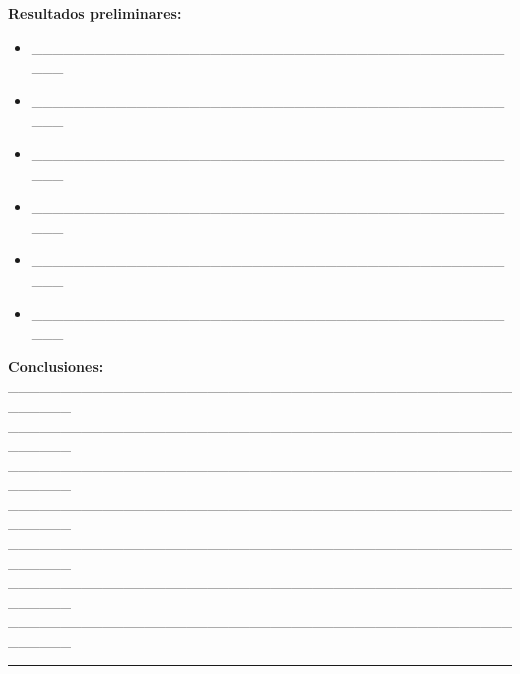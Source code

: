 \vspace{0.5em}
\textbf{Resultados preliminares:}
\begin{itemize}
  \item \_\_\_\_\_\_\_\_\_\_\_\_\_\_\_\_\_\_\_\_\_\_\_\_\_\_\_\_\_\_\_\_\_\_\_\_\_\_\_\_\_\_\_\_\_\_\_\_
  \item \_\_\_\_\_\_\_\_\_\_\_\_\_\_\_\_\_\_\_\_\_\_\_\_\_\_\_\_\_\_\_\_\_\_\_\_\_\_\_\_\_\_\_\_\_\_\_\_
  \item \_\_\_\_\_\_\_\_\_\_\_\_\_\_\_\_\_\_\_\_\_\_\_\_\_\_\_\_\_\_\_\_\_\_\_\_\_\_\_\_\_\_\_\_\_\_\_\_
  \item \_\_\_\_\_\_\_\_\_\_\_\_\_\_\_\_\_\_\_\_\_\_\_\_\_\_\_\_\_\_\_\_\_\_\_\_\_\_\_\_\_\_\_\_\_\_\_\_
  \item \_\_\_\_\_\_\_\_\_\_\_\_\_\_\_\_\_\_\_\_\_\_\_\_\_\_\_\_\_\_\_\_\_\_\_\_\_\_\_\_\_\_\_\_\_\_\_\_
  \item \_\_\_\_\_\_\_\_\_\_\_\_\_\_\_\_\_\_\_\_\_\_\_\_\_\_\_\_\_\_\_\_\_\_\_\_\_\_\_\_\_\_\_\_\_\_\_\_
\end{itemize}

\vspace{0.5em}
\textbf{Conclusiones:} \\
\_\_\_\_\_\_\_\_\_\_\_\_\_\_\_\_\_\_\_\_\_\_\_\_\_\_\_\_\_\_\_\_\_\_\_\_\_\_\_\_\_\_\_\_\_\_\_\_\_\_\_\_\_\_ \\
\_\_\_\_\_\_\_\_\_\_\_\_\_\_\_\_\_\_\_\_\_\_\_\_\_\_\_\_\_\_\_\_\_\_\_\_\_\_\_\_\_\_\_\_\_\_\_\_\_\_\_\_\_\_ \\
\_\_\_\_\_\_\_\_\_\_\_\_\_\_\_\_\_\_\_\_\_\_\_\_\_\_\_\_\_\_\_\_\_\_\_\_\_\_\_\_\_\_\_\_\_\_\_\_\_\_\_\_\_\_ \\
\_\_\_\_\_\_\_\_\_\_\_\_\_\_\_\_\_\_\_\_\_\_\_\_\_\_\_\_\_\_\_\_\_\_\_\_\_\_\_\_\_\_\_\_\_\_\_\_\_\_\_\_\_\_ \\
\_\_\_\_\_\_\_\_\_\_\_\_\_\_\_\_\_\_\_\_\_\_\_\_\_\_\_\_\_\_\_\_\_\_\_\_\_\_\_\_\_\_\_\_\_\_\_\_\_\_\_\_\_\_ \\
\_\_\_\_\_\_\_\_\_\_\_\_\_\_\_\_\_\_\_\_\_\_\_\_\_\_\_\_\_\_\_\_\_\_\_\_\_\_\_\_\_\_\_\_\_\_\_\_\_\_\_\_\_\_ \\
\_\_\_\_\_\_\_\_\_\_\_\_\_\_\_\_\_\_\_\_\_\_\_\_\_\_\_\_\_\_\_\_\_\_\_\_\_\_\_\_\_\_\_\_\_\_\_\_\_\_\_\_\_\_ \\

\vspace{1em}
\hrule
\vspace{1.5em}